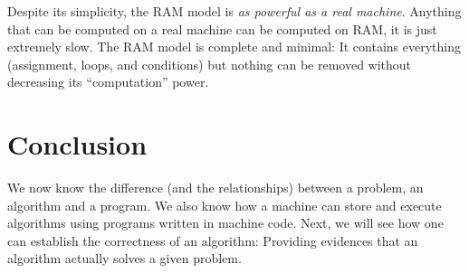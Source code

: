 \documentclass {aldast}
\begin{document}
Despite its simplicity, the RAM model is \emph{as powerful as a real
  machine}. Anything that can be computed on a real machine can be
computed on RAM, it is just extremely slow. The RAM model is complete
and minimal: It contains everything (assignment, loops, and
conditions) but nothing can be removed without decreasing its
``computation'' power.

\section*{Conclusion}
We now know the difference (and the relationships) between a problem,
an algorithm and a program. We also know how a machine can store and
execute algorithms using programs written in machine code. Next, we
will see how one can establish the correctness of an algorithm:
Providing evidences that an algorithm actually solves a given problem.




\end{document}
